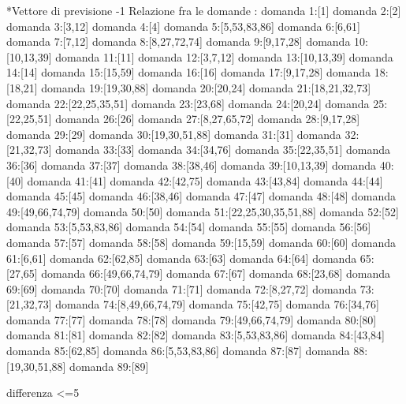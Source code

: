 *Vettore di previsione -1
Relazione fra le domande :
domanda 1:[1]
domanda 2:[2]
domanda 3:[3,12]
domanda 4:[4]
domanda 5:[5,53,83,86]
domanda 6:[6,61]
domanda 7:[7,12]
domanda 8:[8,27,72,74]
domanda 9:[9,17,28]
domanda 10:[10,13,39]
domanda 11:[11]
domanda 12:[3,7,12]
domanda 13:[10,13,39]
domanda 14:[14]
domanda 15:[15,59]
domanda 16:[16]
domanda 17:[9,17,28]
domanda 18:[18,21]
domanda 19:[19,30,88]
domanda 20:[20,24]
domanda 21:[18,21,32,73]
domanda 22:[22,25,35,51]
domanda 23:[23,68]
domanda 24:[20,24]
domanda 25:[22,25,51]
domanda 26:[26]
domanda 27:[8,27,65,72]
domanda 28:[9,17,28]
domanda 29:[29]
domanda 30:[19,30,51,88]
domanda 31:[31]
domanda 32:[21,32,73]
domanda 33:[33]
domanda 34:[34,76]
domanda 35:[22,35,51]
domanda 36:[36]
domanda 37:[37]
domanda 38:[38,46]
domanda 39:[10,13,39]
domanda 40:[40]
domanda 41:[41]
domanda 42:[42,75]
domanda 43:[43,84]
domanda 44:[44]
domanda 45:[45]
domanda 46:[38,46]
domanda 47:[47]
domanda 48:[48]
domanda 49:[49,66,74,79]
domanda 50:[50]
domanda 51:[22,25,30,35,51,88]
domanda 52:[52]
domanda 53:[5,53,83,86]
domanda 54:[54]
domanda 55:[55]
domanda 56:[56]
domanda 57:[57]
domanda 58:[58]
domanda 59:[15,59]
domanda 60:[60]
domanda 61:[6,61]
domanda 62:[62,85]
domanda 63:[63]
domanda 64:[64]
domanda 65:[27,65]
domanda 66:[49,66,74,79]
domanda 67:[67]
domanda 68:[23,68]
domanda 69:[69]
domanda 70:[70]
domanda 71:[71]
domanda 72:[8,27,72]
domanda 73:[21,32,73]
domanda 74:[8,49,66,74,79]
domanda 75:[42,75]
domanda 76:[34,76]
domanda 77:[77]
domanda 78:[78]
domanda 79:[49,66,74,79]
domanda 80:[80]
domanda 81:[81]
domanda 82:[82]
domanda 83:[5,53,83,86]
domanda 84:[43,84]
domanda 85:[62,85]
domanda 86:[5,53,83,86]
domanda 87:[87]
domanda 88:[19,30,51,88]
domanda 89:[89]


differenza <=5

